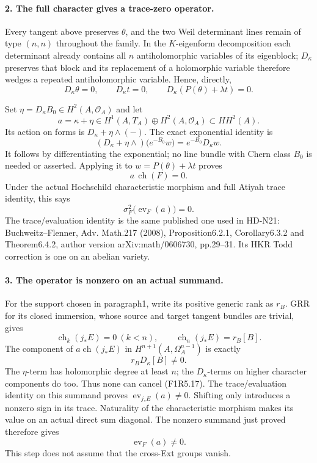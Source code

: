 \paragraph{2. The full character gives a trace-zero operator.}
Every tangent above preserves $\theta$, and the two Weil
determinant lines remain of type $(n,n)$ throughout the family.
In the $K$-eigenform decomposition each determinant already
contains all $n$ antiholomorphic variables of its eigenblock;
$D_\kappa$ preserves that block and its replacement of a
holomorphic variable therefore wedges a repeated
antiholomorphic variable. Hence, directly,
\[
 D_\kappa\theta=0,\qquad D_\kappa t=0,
 \qquad D_\kappa(P(\theta)+\lambda t)=0.
 \tag{F1R5.11}
\]

Set $\eta=D_\kappa B_0\in H^2(A,\mathcal O_A)$ and let
\[
 a=\kappa+\eta\in
 H^1(A,T_A)\oplus H^2(A,\mathcal O_A)\subset HH^2(A).
 \tag{F1R5.12}
\]
Its action on forms is $D_\kappa+\eta\wedge(-)$.
The exact exponential identity is
\[
 (D_\kappa+\eta\wedge)
          \bigl(e^{-B_0}w\bigr)=e^{-B_0}D_\kappa w.
 \tag{F1R5.13}
\]
It follows by differentiating the exponential; no line bundle
with Chern class $B_0$ is needed or asserted. Applying it to
$w=P(\theta)+\lambda t$ proves
\[
 a\,\operatorname{ch}(F)=0.
 \tag{F1R5.14}
\]
Under the actual Hochschild characteristic morphism and full
Atiyah trace identity, this says
\[
 \sigma_F^2\bigl(\operatorname{ev}_F(a)\bigr)=0.
 \tag{F1R5.15}
\]
The trace/evaluation identity is the same published one used
in HD-N21: Buchweitz--Flenner, Adv. Math.217 (2008),
Proposition6.2.1, Corollary6.3.2 and Theorem6.4.2,
author version arXiv:math/0606730, pp.29--31. Its HKR
Todd correction is one on an abelian variety.

\paragraph{3. The operator is nonzero on an actual summand.}
For the support chosen in paragraph1, write its positive
generic rank as $r_B$. GRR for its closed immersion, whose
source and target tangent bundles are trivial, gives
\[
 \operatorname{ch}_k(j_*E)=0\ (k<n),\qquad
 \operatorname{ch}_n(j_*E)=r_B[B].
 \tag{F1R5.16}
\]
The component of $a\operatorname{ch}(j_*E)$ in
$H^{n+1}(A,\Omega_A^{n-1})$ is exactly
\[
                            r_BD_\kappa[B]\ne0.
 \tag{F1R5.17}
\]
The $\eta$-term has holomorphic degree at least $n$;
the $D_\kappa$-terms on higher character components do too.
Thus none can cancel (F1R5.17). The trace/evaluation identity
on this summand proves $\operatorname{ev}_{j_*E}(a)\ne0$.
Shifting only introduces a nonzero sign in its trace.
Naturality of the characteristic morphism makes its value
on an actual direct sum diagonal. The nonzero summand just
proved therefore gives
\[
                     \operatorname{ev}_F(a)\ne0.
 \tag{F1R5.18}
\]
This step does not assume that the cross-Ext groups vanish.

